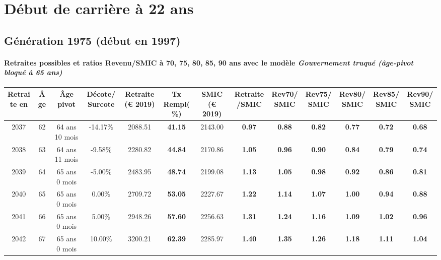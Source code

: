 \section{Début de carrière à 22 ans} 

\subsection{Génération 1975 (début en 1997)} 

\paragraph{Retraites possibles et ratios Revenu/SMIC à 70, 75, 80, 85, 90 ans avec le modèle \emph{Gouvernement truqué (âge-pivot bloqué à 65 ans)}}  
 
{ \scriptsize \begin{center} 
\begin{tabular}[htb]{|c|c||c|c||c|c||c||c|c|c|c|c|c|} 
\hline 
 Retraite en &  Âge &  Âge pivot &  Décote/Surcote &  Retraite (\euro{} 2019) &  Tx Rempl(\%) &  SMIC (\euro{} 2019) &  Retraite/SMIC &  Rev70/SMIC &  Rev75/SMIC &  Rev80/SMIC &  Rev85/SMIC &  Rev90/SMIC \\ 
\hline \hline 
 2037 &  62 &  64 ans 10 mois &  -14.17\% &  2088.51 &  {\bf 41.15} &  2143.00 &  {\bf {\color{red} 0.97}} &  {\bf {\color{red} 0.88}} &  {\bf {\color{red} 0.82}} &  {\bf {\color{red} 0.77}} &  {\bf {\color{red} 0.72}} &  {\bf {\color{red} 0.68}} \\ 
\hline 
 2038 &  63 &  64 ans 11 mois &  -9.58\% &  2280.82 &  {\bf 44.84} &  2170.86 &  {\bf 1.05} &  {\bf {\color{red} 0.96}} &  {\bf {\color{red} 0.90}} &  {\bf {\color{red} 0.84}} &  {\bf {\color{red} 0.79}} &  {\bf {\color{red} 0.74}} \\ 
\hline 
 2039 &  64 &  65 ans 0 mois &  -5.00\% &  2483.95 &  {\bf 48.74} &  2199.08 &  {\bf 1.13} &  {\bf 1.05} &  {\bf {\color{red} 0.98}} &  {\bf {\color{red} 0.92}} &  {\bf {\color{red} 0.86}} &  {\bf {\color{red} 0.81}} \\ 
\hline 
 2040 &  65 &  65 ans 0 mois &  0.00\% &  2709.72 &  {\bf 53.05} &  2227.67 &  {\bf 1.22} &  {\bf 1.14} &  {\bf 1.07} &  {\bf 1.00} &  {\bf {\color{red} 0.94}} &  {\bf {\color{red} 0.88}} \\ 
\hline 
 2041 &  66 &  65 ans 0 mois &  5.00\% &  2948.26 &  {\bf 57.60} &  2256.63 &  {\bf 1.31} &  {\bf 1.24} &  {\bf 1.16} &  {\bf 1.09} &  {\bf 1.02} &  {\bf {\color{red} 0.96}} \\ 
\hline 
 2042 &  67 &  65 ans 0 mois &  10.00\% &  3200.21 &  {\bf 62.39} &  2285.97 &  {\bf 1.40} &  {\bf 1.35} &  {\bf 1.26} &  {\bf 1.18} &  {\bf 1.11} &  {\bf 1.04} \\ 
\hline 
\hline 
\end{tabular} 
\end{center} } 
